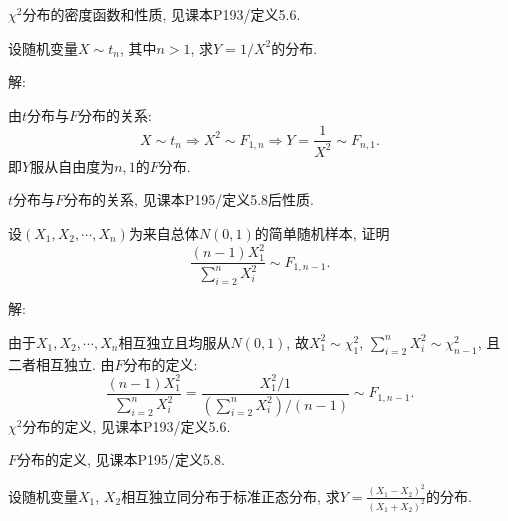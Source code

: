 \documentclass[standard]{ExBook}
\renewenvironment{shaded}{%
  \def\FrameCommand{\fboxsep=\FrameSep \colorbox{shadecolor}}%
  \MakeFramed{\advance\hsize-\width \FrameRestore}%
}{%
  \endMakeFramed
}
\begin{document}
\begin{qitems}
\textcolor{themeColor}{\selectfont {} $\chi^2$分布的密度函数和性质, 见课本P193/定义5.6.}

\vspace{2.5cm-5em}

    \begin{bbox}
    \begin{shaded}
        \qitem
设随机变量$X\sim t_n$, 其中$n>1$, 求$Y=1/X^2$的分布.
    \end{shaded}
    \end{bbox}

\vspace{\dimexpr2.5cm-5em\relax}

解:

由$t$分布与$F$分布的关系:
$$
X\sim t_n \Longrightarrow X^2\sim F_{1,n}
\Longrightarrow Y=\frac{1}{X^2}\sim F_{n,1}.
$$
即$Y$服从自由度为$n,1$的$F$分布.

\textcolor{themeColor}{\selectfont {} $t$分布与$F$分布的关系, 见课本P195/定义5.8后性质.}

\vspace{2.5cm-5em}

    \begin{bbox}
    \begin{shaded}
        \qitem
设$(X_1,X_2,\cdots,X_n)$为来自总体$N(0,1)$的简单随机样本, 证明
$$\displaystyle\frac{(n-1)X_{1}^{2}}{\displaystyle\sum\limits_{i=2}^{n}X_{i}^{2}} \sim F_{1,n-1}.$$
    \end{shaded}
    \end{bbox}

\vspace{\dimexpr2.5cm-5em\relax}

解:

由于$X_1,X_2,\cdots,X_n$相互独立且均服从$N(0,1)$, 故$X_1^2\sim \chi_1^2$, $\displaystyle\sum\limits_{i=2}^{n}X_i^2\sim \chi_{n-1}^2$, 且二者相互独立. 由$F$分布的定义:
$$
\frac{(n-1)X_1^2}{\sum\limits_{i=2}^{n}X_i^2}
=
\frac{X_1^2/1}{\left(\sum\limits_{i=2}^{n}X_i^2\right)/(n-1)}
\sim F_{1,n-1}.
$$
\textcolor{themeColor}{\selectfont {} $\chi^2$分布的定义, 见课本P193/定义5.6.}

\textcolor{themeColor}{\selectfont {}$F$分布的定义, 见课本P195/定义5.8.}

\vspace{2.5cm-5em}

    \begin{bbox}
    \begin{shaded}
        \qitem
设随机变量$X_1$, $X_2$相互独立同分布于标准正态分布, 求$Y = \displaystyle\frac{(X_1-X_2)^2}{(X_1+X_2)^2}$的分布.
    \end{shaded}
    \end{bbox}


\end{qitems}
\end{document}
